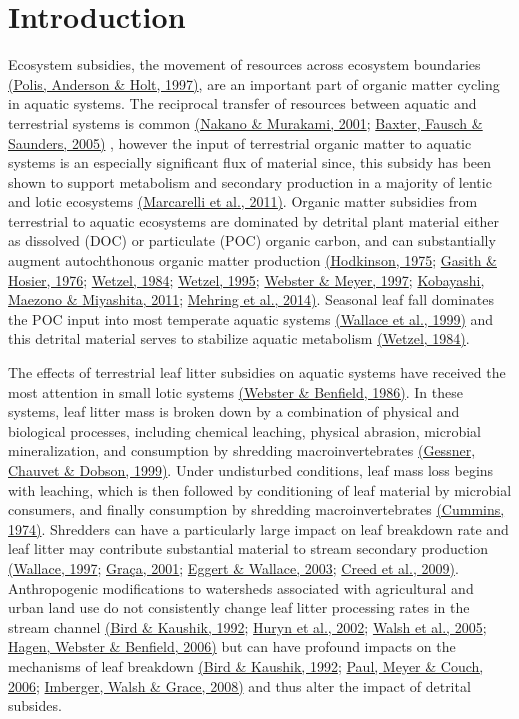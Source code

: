 \documentclass[12pt,letter]{article}
\begin{document}
\newpage

\section{Introduction}
Ecosystem subsidies, the movement of resources across ecosystem boundaries \hyperref[csl:1]{(Polis, Anderson \& Holt, 1997)}, are an important part of organic matter cycling in aquatic systems. The reciprocal transfer of resources between aquatic and terrestrial systems is common \hyperref[csl:2]{(Nakano \& Murakami, 2001}; \hyperref[csl:3]{Baxter, Fausch \& Saunders, 2005)} , however the input of terrestrial organic matter to aquatic systems is an especially significant flux of material since, this subsidy has been shown to support metabolism and secondary production in a majority of lentic and lotic ecosystems \hyperref[csl:4]{(Marcarelli et al., 2011)}. Organic matter subsidies from terrestrial to aquatic ecosystems are dominated by detrital plant material either as dissolved (DOC) or particulate (POC) organic carbon, and can substantially augment autochthonous organic matter production \hyperref[csl:5]{(Hodkinson, 1975}; \hyperref[csl:6]{Gasith \& Hosier, 1976}; \hyperref[csl:7]{Wetzel, 1984}; \hyperref[csl:8]{Wetzel, 1995}; \hyperref[csl:9]{Webster \& Meyer, 1997}; \hyperref[csl:10]{Kobayashi, Maezono \& Miyashita, 2011}; \hyperref[csl:11]{Mehring et al., 2014)}. Seasonal leaf fall dominates the POC input into most temperate aquatic systems \hyperref[csl:12]{(Wallace et al., 1999)} and this detrital material serves to stabilize aquatic metabolism \hyperref[csl:7]{(Wetzel, 1984)}.

The effects of terrestrial leaf litter subsidies on aquatic systems have received the most attention in small lotic systems \hyperref[csl:13]{(Webster \& Benfield, 1986)}.  In these systems, leaf litter mass is broken down by a combination of physical and biological processes, including chemical leaching, physical abrasion, microbial mineralization, and consumption by shredding macroinvertebrates \hyperref[csl:14]{(Gessner, Chauvet \& Dobson, 1999)}. Under undisturbed conditions, leaf mass loss begins with leaching, which is then followed by conditioning of leaf material by microbial consumers, and finally consumption by shredding macroinvertebrates \hyperref[csl:15]{(Cummins, 1974)}. Shredders can have a particularly large impact on leaf breakdown rate and leaf litter may contribute substantial material to stream secondary production \hyperref[csl:16]{(Wallace, 1997}; \hyperref[csl:17]{Gra{\c{c}}a, 2001}; \hyperref[csl:18]{Eggert \& Wallace, 2003}; \hyperref[csl:19]{Creed et al., 2009)}. Anthropogenic modifications to watersheds associated with agricultural and urban land use do not consistently change leaf litter processing rates in the stream channel \hyperref[csl:20]{(Bird \& Kaushik, 1992}; \hyperref[csl:21]{Huryn et al., 2002}; \hyperref[csl:22]{Walsh et al., 2005}; \hyperref[csl:23]{Hagen, Webster \& Benfield, 2006)} but can have profound impacts on the mechanisms of leaf breakdown \hyperref[csl:20]{(Bird \& Kaushik, 1992}; \hyperref[csl:24]{Paul, Meyer \& Couch, 2006}; \hyperref[csl:25]{Imberger, Walsh \& Grace, 2008)} and thus alter the impact of detrital subsides.   
\end{document}
